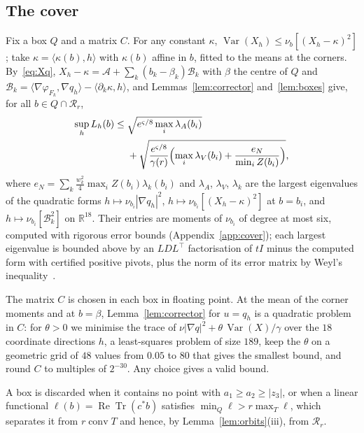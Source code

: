 \documentclass[aps,prd,twocolumn,superscriptaddress,nofootinbib,longbibliography,floatfix,amsmath,amssymb,10pt]{revtex4-2}
\theoremstyle{definition}
\theoremstyle{remark}
\newcommand{\R}{\mathbb{R}}
\newcommand{\ReTr}{\operatorname{Re}\operatorname{Tr}}
\newcommand{\Var}{\operatorname{Var}}
\newcommand{\ip}[2]{\langle #1,#2\rangle}
\begin{document}
\subsection{The cover}\label{ssec:cover}

Fix a box $Q$ and a matrix $C$. For any constant $\kappa$, $\Var(X_h)\le
\nu_b[(X_h-\kappa)^2]$; take $\kappa=\ip{\kappa(b)}h$ with $\kappa(b)$ affine in
$b$, fitted to the means at the corners. By~\eqref{eq:Xq}, $X_h-\kappa=
\mathcal A+\sum_k(b_k-\beta_k)\mathcal B_k$ with $\beta$ the centre of $Q$ and
$\mathcal B_k=\ip{\nabla\varphi_{F_k}}{\nabla q_h}-\ip{\partial_k\kappa}h$, and
Lemmas~\ref{lem:corrector} and~\ref{lem:boxes} give, for all $b\in Q\cap
\mathcal R_r$,
\begin{equation}\label{eq:BQ}
\begin{split}
\sup_hL_h(b)\le{}&\sqrt{e^{\varsigma/8}\max_i\lambda_A(b_i)}\\
&+\sqrt{\frac{e^{\varsigma/8}}{\gamma(r)}\Bigl(\max_i\lambda_V(b_i)+
\frac{e_N}{\min_iZ(b_i)}\Bigr)} ,
\end{split}
\end{equation}
where $e_N=\sum_k\frac{w_k^2}4\max_iZ(b_i)\lambda_k(b_i)$ and $\lambda_A$,
$\lambda_V$, $\lambda_k$ are the largest eigenvalues of the quadratic forms
$h\mapsto\nu_{b_i}|\nabla q_h|^2$, $h\mapsto\nu_{b_i}[(X_h-\kappa)^2]$ at $b=b_i$,
and $h\mapsto\nu_{b_i}[\mathcal B_k^2]$ on $\R^{18}$. Their entries are moments
of $\nu_{b_i}$ of degree at most six, computed with rigorous error bounds
(Appendix~\ref{app:cover}); each largest eigenvalue is bounded above by an
$LDL^\top$ factorisation of $tI$ minus the computed form with certified
positive pivots, plus the norm of its error matrix by Weyl's
inequality~\cite{Hig02,Joh17}.

The matrix $C$ is chosen in each box in floating point. At the mean of the
corner moments and at $b=\beta$, Lemma~\ref{lem:corrector} for $u=q_h$ is a
quadratic problem in $C$: for $\theta>0$ we minimise the trace of
$\nu|\nabla q|^2+\theta\,\Var(X)/\gamma$ over the $18$ coordinate directions
$h$, a least-squares problem of size $189$, keep the $\theta$ on a geometric grid of
$48$ values from $0.05$ to $80$ that gives the smallest bound, and round $C$ to multiples of
$2^{-30}$. Any choice gives a valid bound.

A box is discarded when it contains no point with $a_1\ge a_2\ge|z_3|$, or
when a linear functional $\ell(b)=\ReTr(c^*b)$ satisfies $\min_Q\ell>r\max_T
\ell$, which separates it from $r\operatorname{conv}T$ and hence, by
Lemma~\ref{lem:orbits}(iii), from $\mathcal R_r$.
\end{document}
